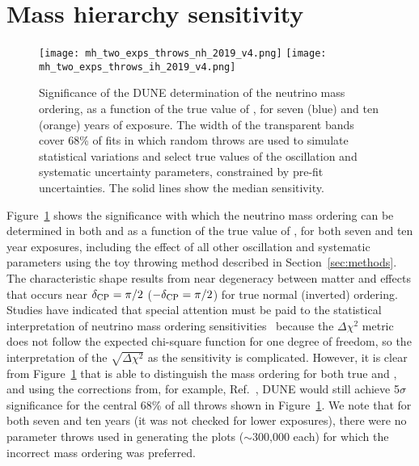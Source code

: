 \section{Mass hierarchy sensitivity}
\label{sec:mh_sens}

\begin{figure}[htbp]
  \centering
  \texttt{[image: mh\_two\_exps\_throws\_nh\_2019\_v4.png]}
  \texttt{[image: mh\_two\_exps\_throws\_ih\_2019\_v4.png]}
  \caption[Significance of the DUNE neutrino mass ordering determination, as a function of \deltacp]{Significance of the DUNE determination of the neutrino mass ordering, as a function of the true value of \deltacp, for seven (blue) and ten (orange) years of exposure. The width of the transparent bands cover 68\% of fits in which random throws are used to simulate statistical variations and select true values of the oscillation and systematic uncertainty parameters, constrained by pre-fit uncertainties. The solid lines show the median sensitivity.}
  \label{fig:mh_nominal}
\end{figure}
Figure~\ref{fig:mh_nominal} shows the significance with which the neutrino mass ordering can be determined in both  and  as a function of the true value of \deltacp, for both seven and ten year exposures, including the effect of all other oscillation and systematic parameters using the toy throwing method described in Section~\ref{sec:methods}. The characteristic shape results from near degeneracy between matter and  effects that occurs near $\delta_{\rm CP}=\pi/2$ ($-\delta_{\rm CP}=\pi/2$) for true normal (inverted) ordering. Studies have indicated that special attention must be paid to the statistical interpretation of neutrino mass ordering sensitivities~\cite{Ciuffoli:2013rza,Qian:2012zn,Blennow:2013oma} because the $\Delta\chi^2$ metric does not follow the expected chi-square function for one degree of freedom, so the interpretation of the $\sqrt{\Delta \chi^{2}}$ as the sensitivity is complicated. However, it is clear from Figure~\ref{fig:mh_nominal} that  is able to distinguish the mass ordering for both true  and , and using the corrections from, for example, Ref.~\cite{Ciuffoli:2013rza}, DUNE would still achieve 5$\sigma$ significance for the central 68\% of all throws shown in Figure~\ref{fig:mh_nominal}. We note that for both seven and ten years (it was not checked for lower exposures), there were no parameter throws used in generating the plots ($\sim$300,000 each) for which the incorrect mass ordering was preferred.

